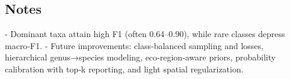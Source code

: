 \documentclass[utf8]{frontiers_suppmat}
\begin{document}
\subsection*{Notes}
- Dominant taxa attain high F1 (often 0.64–0.90), while rare classes depress macro‑F1.
- Future improvements: class‑balanced sampling and losses, hierarchical genus→species modeling, eco‑region‑aware priors, probability calibration with top‑k reporting, and light spatial regularization.



\end{document}
